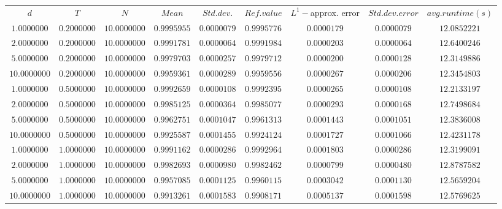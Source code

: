 \begin{tabular}{ccccccccc}
$d$ & $T$ & $N$ & $Mean$ & $Std. dev.$ & $Ref. value$ & $L^1-$approx. error & $Std. dev. error$ & $avg. runtime (s)$\\
$1.0000000$ & $0.2000000$ & $10.0000000$ & $0.9995955$ & $0.0000079$ & $0.9995776$ & $0.0000179$ & $0.0000079$ & $12.0852221$\\
$2.0000000$ & $0.2000000$ & $10.0000000$ & $0.9991781$ & $0.0000064$ & $0.9991984$ & $0.0000203$ & $0.0000064$ & $12.6400246$\\
$5.0000000$ & $0.2000000$ & $10.0000000$ & $0.9979703$ & $0.0000257$ & $0.9979712$ & $0.0000200$ & $0.0000128$ & $12.3149886$\\
$10.0000000$ & $0.2000000$ & $10.0000000$ & $0.9959361$ & $0.0000289$ & $0.9959556$ & $0.0000267$ & $0.0000206$ & $12.3454803$\\
$1.0000000$ & $0.5000000$ & $10.0000000$ & $0.9992659$ & $0.0000108$ & $0.9992395$ & $0.0000265$ & $0.0000108$ & $12.2133197$\\
$2.0000000$ & $0.5000000$ & $10.0000000$ & $0.9985125$ & $0.0000364$ & $0.9985077$ & $0.0000293$ & $0.0000168$ & $12.7498684$\\
$5.0000000$ & $0.5000000$ & $10.0000000$ & $0.9962751$ & $0.0001047$ & $0.9961313$ & $0.0001443$ & $0.0001051$ & $12.3836008$\\
$10.0000000$ & $0.5000000$ & $10.0000000$ & $0.9925587$ & $0.0001455$ & $0.9924124$ & $0.0001727$ & $0.0001066$ & $12.4231178$\\
$1.0000000$ & $1.0000000$ & $10.0000000$ & $0.9991162$ & $0.0000286$ & $0.9992964$ & $0.0001803$ & $0.0000286$ & $12.3199091$\\
$2.0000000$ & $1.0000000$ & $10.0000000$ & $0.9982693$ & $0.0000980$ & $0.9982462$ & $0.0000799$ & $0.0000480$ & $12.8787582$\\
$5.0000000$ & $1.0000000$ & $10.0000000$ & $0.9957085$ & $0.0001125$ & $0.9960115$ & $0.0003042$ & $0.0001130$ & $12.5659204$\\
$10.0000000$ & $1.0000000$ & $10.0000000$ & $0.9913261$ & $0.0001583$ & $0.9908171$ & $0.0005137$ & $0.0001598$ & $12.5769625$\\
\end{tabular}
